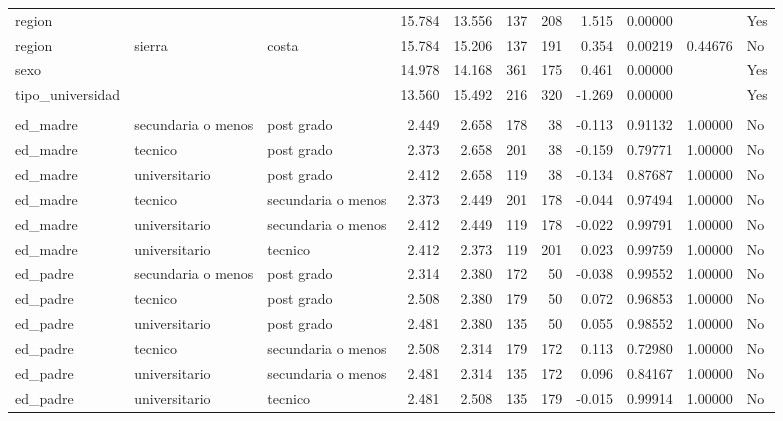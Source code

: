 \documentclass[
  letterpaper,
  DIV=11,
  numbers=noendperiod]{scrartcl}
\begin{document}
\begin{table}
\begin{tabular*}{\linewidth}{@{\extracolsep{\fill}}lllrrrrrrrl}
region & {\cellcolor[HTML]{90EE90}{sierra}} & {\cellcolor[HTML]{90EE90}{selva}} & 15.784 & 13.556 & 137 & 208 & 1.515 & 0.00000 & {\cellcolor[HTML]{90EE90}{0.00000}} & Yes \\ 
region & sierra & costa & 15.784 & 15.206 & 137 & 191 & 0.354 & 0.00219 & 0.44676 & No \\ 
sexo & {\cellcolor[HTML]{90EE90}{Mujer}} & {\cellcolor[HTML]{90EE90}{Hombre}} & 14.978 & 14.168 & 361 & 175 & 0.461 & 0.00000 & {\cellcolor[HTML]{90EE90}{0.00000}} & Yes \\ 
tipo\_universidad & {\cellcolor[HTML]{90EE90}{publica}} & {\cellcolor[HTML]{90EE90}{privada}} & 13.560 & 15.492 & 216 & 320 & -1.269 & 0.00000 & {\cellcolor[HTML]{90EE90}{0.00000}} & Yes \\ 
\midrule\addlinespace[2.5pt]
\multicolumn{11}{l}{desercion} \\[2.5pt] 
\midrule\addlinespace[2.5pt]
ed\_madre & secundaria o menos & post grado & 2.449 & 2.658 & 178 & 38 & -0.113 & 0.91132 & 1.00000 & No \\ 
ed\_madre & tecnico & post grado & 2.373 & 2.658 & 201 & 38 & -0.159 & 0.79771 & 1.00000 & No \\ 
ed\_madre & universitario & post grado & 2.412 & 2.658 & 119 & 38 & -0.134 & 0.87687 & 1.00000 & No \\ 
ed\_madre & tecnico & secundaria o menos & 2.373 & 2.449 & 201 & 178 & -0.044 & 0.97494 & 1.00000 & No \\ 
ed\_madre & universitario & secundaria o menos & 2.412 & 2.449 & 119 & 178 & -0.022 & 0.99791 & 1.00000 & No \\ 
ed\_madre & universitario & tecnico & 2.412 & 2.373 & 119 & 201 & 0.023 & 0.99759 & 1.00000 & No \\ 
ed\_padre & secundaria o menos & post grado & 2.314 & 2.380 & 172 & 50 & -0.038 & 0.99552 & 1.00000 & No \\ 
ed\_padre & tecnico & post grado & 2.508 & 2.380 & 179 & 50 & 0.072 & 0.96853 & 1.00000 & No \\ 
ed\_padre & universitario & post grado & 2.481 & 2.380 & 135 & 50 & 0.055 & 0.98552 & 1.00000 & No \\ 
ed\_padre & tecnico & secundaria o menos & 2.508 & 2.314 & 179 & 172 & 0.113 & 0.72980 & 1.00000 & No \\ 
ed\_padre & universitario & secundaria o menos & 2.481 & 2.314 & 135 & 172 & 0.096 & 0.84167 & 1.00000 & No \\ 
ed\_padre & universitario & tecnico & 2.481 & 2.508 & 135 & 179 & -0.015 & 0.99914 & 1.00000 & No \\ 

\end{tabular*}
\end{table}
\end{document}
